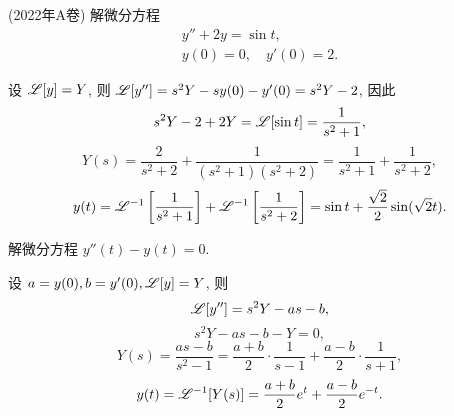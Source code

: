\begin{example}
	(2022年A卷) 解微分方程
	\begin{align*}
		y''+2y=\sin t,\\
		y(0)=0,\quad y'(0)=2.
	\end{align*}
\end{example}
\begin{solution}
	设 $\mathscr{L}[y]=Y$, 则 $\mathscr{L}[y'']=s^2Y-sy(0)-y'(0)=s^2Y-2$, 因此
		\[s^2Y-2+2Y=\mathscr{L}[\sin t]=\frac{1}{s^2+1},\]
		\[Y(s)=\frac{2}{s^2+2}+\frac{1}{(s^2+1)(s^2+2)}=\frac{1}{s^2+1}+\frac{1}{s^2+2},\]
		\[y(t)=\mathscr{L}^{-1}\left[\frac{1}{s^2+1}\right]+\mathscr{L}^{-1}\left[\frac{1}{s^2+2}\right]
		=\sin t+\frac{\sqrt 2}2\sin(\sqrt 2 t). \]
\end{solution}

\begin{example}
	解微分方程 $y''(t)-y(t)=0$.
\end{example}
\begin{solution}
	设 $a=y(0),b=y'(0),\mathscr{L}[y]=Y$, 则
		\[\mathscr{L}[y'']=s^2Y-as-b,\]
		\[s^2Y-as-b-Y=0,\]
		\[Y(s)=\frac{as-b}{s^2-1}=\frac{a+b}2\cdot\frac1{s-1}+\frac{a-b}2\cdot\frac1{s+1},\]
		\[y(t)=\mathscr{L}^{-1}[Y(s)]=\frac{a+b}2e^t+\frac{a-b}2e^{-t}.\]
\end{solution}

